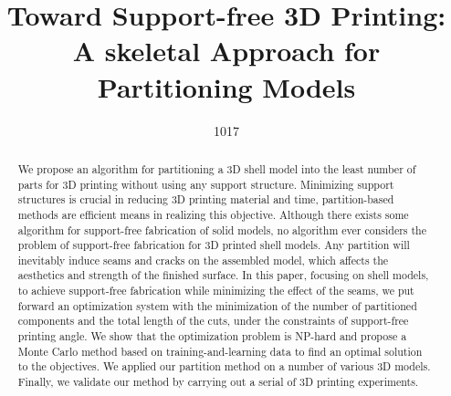 \documentclass{egpubl}
\title[Toward Support-free 3D Printing:]%
      {Toward Support-free 3D Printing: A skeletal Approach for Partitioning Models}
\author[1017]{1017}
\begin{document}

\maketitle

\begin{abstract}
   We propose an algorithm for partitioning a 3D shell model into the least number of parts for 3D printing without using any support structure. Minimizing support structures is crucial in reducing 3D printing material and time, partition-based methods are efficient means in realizing this objective. Although there exists some algorithm for support-free fabrication of solid models, no algorithm ever considers the problem of support-free fabrication for 3D printed shell models. Any partition will inevitably induce seams and cracks on the assembled model, which affects the aesthetics and strength of the finished surface. In this paper, focusing on shell models, to achieve support-free fabrication while minimizing the effect of the seams, we put forward an optimization system with the minimization of the number of partitioned components and the total length of the cuts, under the constraints of support-free printing angle. We show that the optimization problem is NP-hard and propose a Monte Carlo method based on training-and-learning data to find an optimal solution to the objectives. We applied our partition method on a number of various 3D models. Finally, we validate our method by carrying out a serial of 3D printing experiments.


\begin{classification} %
\end{classification}

\end{abstract}












\end{document}
